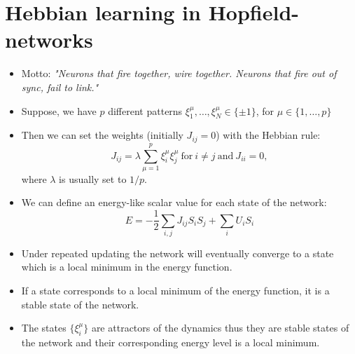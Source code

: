 \documentclass[12pt]{article}
\numberwithin{equation}{section}
\begin{document}
\section*{Hebbian learning in Hopfield-networks}
\begin{itemize}
    \item Motto: \textit{"Neurons that fire together, wire together. Neurons that fire out of sync, fail to link."}
    \item Suppose, we have $p$ different patterns $\xi^{\mu}_1, \dots, \xi^{\mu}_N \in \{\pm 1\}$, for $\mu \in \{1,\dots,p\}$
    \item Then we can set the weights (initially $J_{ij}=0$) with the Hebbian rule:
    \begin{equation*}
        J_{ij} = \lambda\sum\limits_{\mu=1}^{p}\xi^{\mu}_i\xi^{\mu}_j~\textrm{for}~i\neq j~\textrm{and}~J_{ii}=0,
    \end{equation*}
    where $\lambda$ is usually set to $1/p$.
    \item We can define an energy-like scalar value for each state of the network:
    \begin{equation*}
        E = -\frac{1}{2}\sum\limits_{i,j}J_{ij}S_iS_j + \sum\limits_iU_iS_i
    \end{equation*}
    \item Under repeated updating the network will eventually converge to a state which is a
    local minimum in the energy function.
    \item If a state corresponds to a local minimum of the energy function, it is a stable state of the network.
    \item The states $\{\xi_i^{\mu}\}$ are attractors of the dynamics thus they are stable states of the network and
    their corresponding energy level is a local minimum.
\end{itemize}

\newpage
\end{document}
